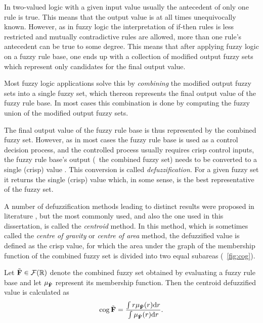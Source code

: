 In two-valued logic with a given input value usually the antecedent of only one rule is true. This means that the output value is at all times unequivocally known. However, as in fuzzy logic the interpretation of if-then rules is less restricted and mutually contradictive rules are allowed, more than one rule's antecedent can be true to some degree. This means that after applying fuzzy logic on a fuzzy rule base, one ends up with a collection of modified output fuzzy sets which represent only candidates for the final output value. 

Most fuzzy logic applications solve this by \emph{combining} the modified output fuzzy sets into a single fuzzy set, which thereon represents the final output value of the fuzzy rule base. In most cases this combination is done by computing the fuzzy union of the modified output fuzzy sets. 

The final output value of the fuzzy rule base is thus represented by the combined fuzzy set. However, as in most cases the fuzzy rule base is used as a control decision process, and the controlled process usually requires crisp control inputs, the fuzzy rule base's output (\ie\ the combined fuzzy set) needs to be converted to a single (crisp) value \cite{klir:1995,mendel:2001}. This conversion is called \emph{defuzzification}. For a given fuzzy set it returns the single (crisp) value which, in some sense, is the best representative of the fuzzy set.

A number of defuzzification methods leading to distinct results were proposed in literature \cite{dubois:1980,klir:1995,mendel:2001,pedrycz:1993,zimmermann:2001}, but the most commonly used, and also the one used in this dissertation, is called the \emph{centroid} method. In this method, which is sometimes called the \emph{centre of gravity} or \emph{centre of area} method, the defuzzified value is defined as the crisp value, for which the area under the graph of the membership function of the combined fuzzy set is divided into two equal subareas (\fig~\ref{fig:cog}). 

Let ${\tilde{{\mathbf{F}}}} \in {\ensuremath{\mathcal{F}(\mathbb{R})}}$ denote the combined fuzzy set obtained by evaluating a fuzzy rule base and let $\mu_{\tilde{{\mathbf{F}}}}$ represent its membership function. Then the centroid defuzzified value is calculated as
\begin{equation}
\operatorname*{cog}{\tilde{{\mathbf{F}}}}=\frac{\int r
\mu_{\tilde{{\mathbf{F}}}}(r)\mathrm{d}r}{\int\mu_{\tilde{{\mathbf{F}}}}(r)\mathrm{d}r}.
\end{equation}


